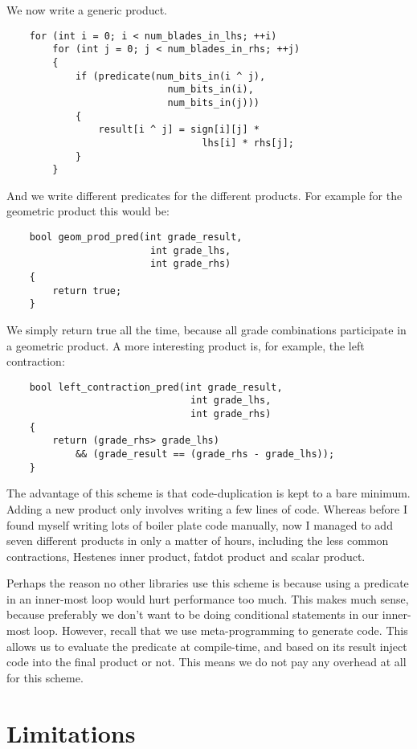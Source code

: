 \documentclass[10pt]{article}
\begin{document}
We now write a generic product.
\begin{verbatim}
    for (int i = 0; i < num_blades_in_lhs; ++i)
        for (int j = 0; j < num_blades_in_rhs; ++j)
        {
            if (predicate(num_bits_in(i ^ j),
                            num_bits_in(i),
                            num_bits_in(j)))
            {
                result[i ^ j] = sign[i][j] *
                                  lhs[i] * rhs[j];
            }
        }
\end{verbatim}
And we write different predicates for the different products. For
example for the geometric product this would be:
\begin{verbatim}
    bool geom_prod_pred(int grade_result,
                         int grade_lhs,
                         int grade_rhs)
    {
        return true;
    }
\end{verbatim}
We simply return true all the time, because all grade combinations
participate in a geometric product. A more interesting product is,
for example, the left contraction:
\begin{verbatim}
    bool left_contraction_pred(int grade_result,
                                int grade_lhs,
                                int grade_rhs)
    {
        return (grade_rhs> grade_lhs)
            && (grade_result == (grade_rhs - grade_lhs));
    }
\end{verbatim}
The advantage of this scheme is that code-duplication is kept to a
bare minimum. Adding a new product only involves writing a few
lines of code. Whereas before I found myself writing lots of
boiler plate code manually, now I managed to add seven different
products in only a matter of hours, including the less common
contractions, Hestenes inner product, fatdot product and scalar
product.

Perhaps the reason no other libraries use this scheme is because
using a predicate in an inner-most loop would hurt performance too
much. This makes much sense, because preferably we don't want to
be doing conditional statements in our inner-most loop. However,
recall that we use meta-programming to generate code. This allows
us to evaluate the predicate at compile-time, and based on its
result inject code into the final product or not. This means we do
not pay any overhead at all for this scheme.

\section{Limitations}
\end{document}
